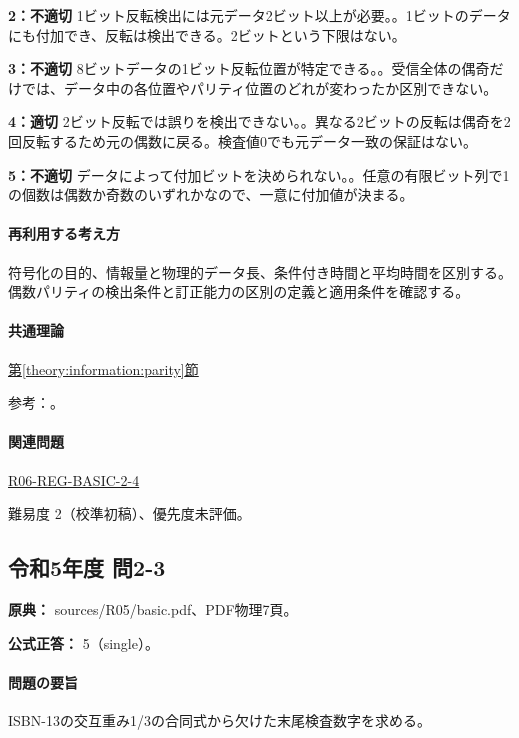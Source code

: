 \noindent\textbf{2：不適切} 1ビット反転検出には元データ2ビット以上が必要。。1ビットのデータにも付加でき、反転は検出できる。2ビットという下限はない。\par

\noindent\textbf{3：不適切} 8ビットデータの1ビット反転位置が特定できる。。受信全体の偶奇だけでは、データ中の各位置やパリティ位置のどれが変わったか区別できない。\par

\noindent\textbf{4：適切} 2ビット反転では誤りを検出できない。。異なる2ビットの反転は偶奇を2回反転するため元の偶数に戻る。検査値0でも元データ一致の保証はない。\par

\noindent\textbf{5：不適切} データによって付加ビットを決められない。。任意の有限ビット列で1の個数は偶数か奇数のいずれかなので、一意に付加値が決まる。\par

\paragraph{再利用する考え方} 符号化の目的、情報量と物理的データ長、条件付き時間と平均時間を区別する。偶数パリティの検出条件と訂正能力の区別の定義と適用条件を確認する。

\paragraph{共通理論} \hyperref[theory:information:parity]{第\ref*{theory:information:parity}節}

\par 参考：\cite{info_errors}。

\paragraph{関連問題} \hyperref[q:r06-reg-basic-2-4]{R06-REG-BASIC-2-4}

\par 難易度 2（校準初稿）、優先度未評価。

\subsection{令和5年度 問2-3}
\label{q:r05-reg-basic-2-3}

\noindent\textbf{原典：} sources/R05/basic.pdf、PDF物理7頁。

\textbf{公式正答：} 5（single）。

\paragraph{問題の要旨} ISBN-13の交互重み1/3の合同式から欠けた末尾検査数字を求める。

